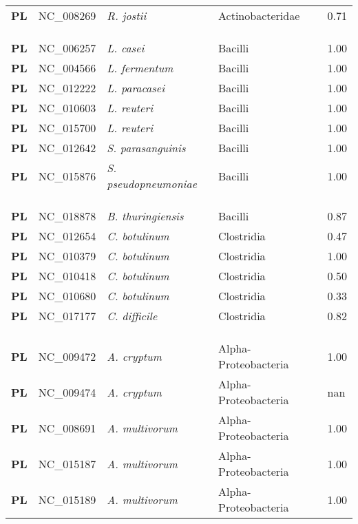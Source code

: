 \begin{adjustwidth}{-3cm}{2cm}
{\begin{supertabular}{>{\bfseries}l|p{0.1\textwidth}p{0.14\textwidth}l|l}
PL & NC\_008269 & \textit{R. jostii} & Actinobacteridae & 0.71\\
\\
\\
\hline\\
PL & NC\_006257 & \textit{L. casei} & Bacilli & 1.00\\
PL & NC\_004566 & \textit{L. fermentum} & Bacilli & 1.00\\
PL & NC\_012222 & \textit{L. paracasei} & Bacilli & 1.00\\
PL & NC\_010603 & \textit{L. reuteri} & Bacilli & 1.00\\
PL & NC\_015700 & \textit{L. reuteri} & Bacilli & 1.00\\
PL & NC\_012642 & \textit{S. parasanguinis} & Bacilli & 1.00\\
PL & NC\_015876 & \textit{S. pseudopneumoniae} & Bacilli & 1.00\\
\\
\\
\hline\\
PL & NC\_018878 & \textit{B. thuringiensis} & Bacilli & 0.87\\
PL & NC\_012654 & \textit{C. botulinum} & Clostridia & 0.47\\
PL & NC\_010379 & \textit{C. botulinum} & Clostridia & 1.00\\
PL & NC\_010418 & \textit{C. botulinum} & Clostridia & 0.50\\
PL & NC\_010680 & \textit{C. botulinum} & Clostridia & 0.33\\
PL & NC\_017177 & \textit{C. difficile} & Clostridia & 0.82\\
\\
\\
\hline\\
PL & NC\_009472 &  \textit{A. cryptum} & Alpha-Proteobacteria & 1.00\\
PL & NC\_009474 &  \textit{A. cryptum} & Alpha-Proteobacteria & nan\\
PL & NC\_008691 &  \textit{A. multivorum} & Alpha-Proteobacteria & 1.00\\
PL & NC\_015187 &  \textit{A. multivorum} & Alpha-Proteobacteria & 1.00\\
PL & NC\_015189 &  \textit{A. multivorum} & Alpha-Proteobacteria & 1.00\\

\end{supertabular}}
\end{adjustwidth}
